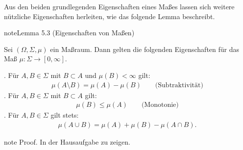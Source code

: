 \documentclass[letterpaper,10pt,german]{jupyterBook}
\begin{document}
\sphinxAtStartPar
Aus den beiden grundlegenden Eigenschaften eines Maßes lassen sich weitere nützliche Eigenschaften herleiten, wie das folgende Lemma beschreibt.
\label{masstheorie/masstheorie:lemma-6}
\begin{sphinxadmonition}{note}{Lemma 5.3 (Eigenschaften von Maßen)}



\sphinxAtStartPar
Sei \((\Omega, \Sigma, \mu)\) ein Maßraum.
Dann gelten die folgenden Eigenschaften für das Maß \(\mu \colon \Sigma \rightarrow [0,\infty]\).

. Für \(A,B \in \Sigma\) mit \(B \subset A\) und \(\mu(B) < \infty\) gilt:
\begin{equation*}
\begin{split}\mu(A \setminus B) = \mu(A) - \mu(B) \qquad \text{(Subtraktivität)}\end{split}
\end{equation*}
. Für \(A,B \in \Sigma\) mit \(B \subset A\) gilt:
\begin{equation*}
\begin{split}\mu(B) \leq \mu(A) \qquad \text{(Monotonie)}\end{split}
\end{equation*}
. Für \(A,B \in \Sigma\) gilt stets:
\begin{equation*}
\begin{split}\mu(A \cup B) = \mu(A) + \mu(B) - \mu(A \cap B).\end{split}
\end{equation*}\end{sphinxadmonition}

\begin{sphinxadmonition}{note}
\sphinxAtStartPar
Proof. In der Hausaufgabe zu zeigen.
\end{sphinxadmonition}
\end{document}
